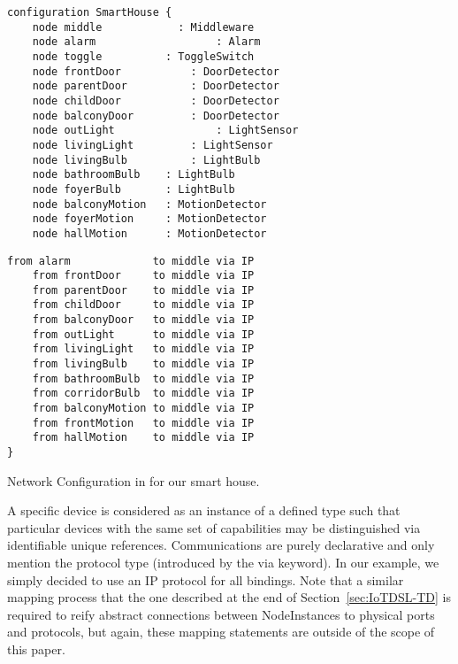 	
\begin{table}
	\begin{minipage}[b]{.45\textwidth }%
		\begin{lstlisting}[language=iotdsl]	
configuration SmartHouse {
	node middle   		   : Middleware
	node alarm					 : Alarm
	node toggle          : ToggleSwitch
	node frontDoor			 : DoorDetector
	node parentDoor			 : DoorDetector
	node childDoor			 : DoorDetector
	node balconyDoor 		 : DoorDetector
	node outLight				 : LightSensor
	node livingLight		 : LightSensor
	node livingBulb			 : LightBulb
	node bathroomBulb    : LightBulb
	node foyerBulb       : LightBulb
	node balconyMotion	 : MotionDetector
	node foyerMotion  	 : MotionDetector
	node hallMotion	     : MotionDetector
		\end{lstlisting}
	\end{minipage}\hfill%
	\begin{minipage}[b]{.45\textwidth}
		\begin{lstlisting}[language=iotdsl, firstnumber=17]
	from alarm			   to middle via IP
	from frontDoor 	   to middle via IP
	from parentDoor    to middle via IP
	from childDoor     to middle via IP
	from balconyDoor   to middle via IP
	from outLight      to middle via IP
	from livingLight   to middle via IP
	from livingBulb    to middle via IP
	from bathroomBulb  to middle via IP
	from corridorBulb  to middle via IP
	from balconyMotion to middle via IP
	from frontMotion   to middle via IP
	from hallMotion    to middle via IP
}
		\end{lstlisting}
		\vspace*{.3cm}
	\end{minipage}
	\caption{Network Configuration in \IOTDSL for our smart house.}
	\label{lis:RE-Network}
\end{table}
	
A specific device is considered as an instance of a defined type such that particular devices with the same set of capabilities may be distinguished via identifiable unique references. Communications are purely declarative and only mention the protocol type (introduced by the \textsf{via} keyword). In our example, we simply decided to use an \textsf{IP} protocol for all bindings. Note that a similar mapping process that the one described at the end of Section~\ref{sec:IoTDSL-TD} is required to reify abstract connections between \textsf{NodeInstances} to physical ports and protocols, but again, these mapping statements are outside of the scope of this paper. 

